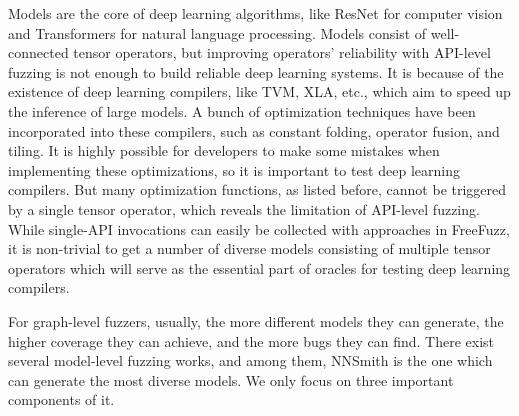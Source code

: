 \documentclass{article}
\begin{document}
Models are the core of deep learning algorithms, like ResNet for computer vision and Transformers for natural language processing. Models consist of well-connected tensor operators, but improving operators' reliability with API-level fuzzing is not enough to build reliable deep learning systems. It is because of the existence of deep learning compilers, like TVM, XLA, etc., which aim to speed up the inference of large models. A bunch of optimization techniques have been incorporated into these compilers, such as constant folding, operator fusion, and tiling. It is highly possible for developers to make some mistakes when implementing these optimizations, so it is important to test deep learning compilers. But many optimization functions, as listed before, cannot be triggered by a single tensor operator, which reveals the limitation of API-level fuzzing. While single-API invocations can easily be collected with approaches in FreeFuzz, it is non-trivial to get a number of diverse models consisting of multiple tensor operators which will serve as the essential part of oracles for testing deep learning compilers.

For graph-level fuzzers, usually, the more different models they can generate, the higher coverage they can achieve, and the more bugs they can find. There exist several model-level fuzzing works, and among them, NNSmith is the one which can generate the most diverse models. We only focus on three important components of it.
\end{document}
